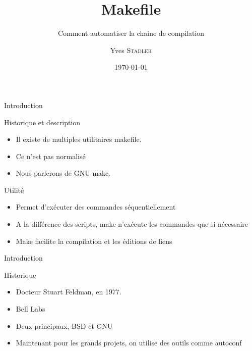 
\title{Makefile}
\subtitle{Comment automatiser la chaine de compilation}

\author{Yves \textsc{Stadler}}

\date{\today}




\begin{frame}
\titlepage
\end{frame}


\def\ftitle{Introduction}
\begin{frame}[containsverbatim]{\ftitle}
\def\blocktitle{Historique et description}
\begin{block}{\blocktitle}
\begin{itemize}
\item Il existe de multiples utilitaires makefile.
\item Ce n'est pas normalisé
\item Nous parlerons de GNU make.
\end{itemize}
\end{block}


\def\blocktitle{Utilité}
\begin{block}{\blocktitle}
\begin{itemize}
\item Permet d'exécuter des commandes séquentiellement
\item A la différence des scripts, make n'exécute les commandes que si nécessaire
\item Make facilite la compilation et les éditions de liens
\end{itemize}
\end{block}
\end{frame}


\def\ftitle{Introduction}
\begin{frame}[containsverbatim]{\ftitle}
\def\blocktitle{Historique}
\begin{block}{\blocktitle}
\begin{itemize}
\item Docteur Stuart Feldman, en 1977.
\item Bell Labs
\item Deux principaux, BSD et GNU
\item Maintenant pour les grands projets, on utilise des outils comme autoconf
\end{itemize}
\end{block}
\end{frame}


